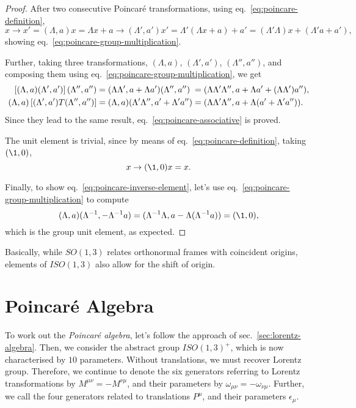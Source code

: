 \begin{proof}
    After two consecutive Poincaré transformations, using eq.~\eqref{eq:poincare-definition},
    \begin{equation*}
        x \to x' = (\Lambda,a)x = \Lambda x + a \to (\Lambda',a')x' = \Lambda' (\Lambda x + a) + a' = (\Lambda' \Lambda)x + (\Lambda' a + a') ,
    \end{equation*}
    showing eq.~\eqref{eq:poincare-group-multiplication}.

    Further, taking three transformations, $(\Lambda,a)$, $(\Lambda',a')$, $(\Lambda'',a'')$, and composing them using eq.~\eqref{eq:poincare-group-multiplication}, we get
    \begin{equation*}
    \begin{alignedat}[t]{2}
        \left[ (\Lambda,a)(\Lambda',a') \right] (\Lambda'',a'') &= (\Lambda\Lambda', a + \Lambda a') (\Lambda'',a'') &&= (\Lambda\Lambda'\Lambda'', a + \Lambda a' + (\Lambda \Lambda')a'') , \\
        (\Lambda,a)\left[(\Lambda',a')T(\Lambda'',a'')\right] &= (\Lambda,a) (\Lambda'\Lambda'', a' + \Lambda' a'') &&= (\Lambda\Lambda'\Lambda'', a+\Lambda(a' + \Lambda' a'')) .
    \end{alignedat}
    \end{equation*}
    Since they lead to the same result, eq.~\eqref{eq:poincare-associative} is proved.

    The unit element is trivial, since by means of eq.~\eqref{eq:poincare-definition}, taking $(\1,0)$,
    \begin{equation*}
        x \to (\1,0) x = x.
    \end{equation*}

    Finally, to show eq.~\eqref{eq:poincare-inverse-element}, let's use eq.~\eqref{eq:poincare-group-multiplication} to compute
    \begin{equation*}
       (\Lambda,a) (\Lambda^{-1}, -\Lambda^{-1}a) = (\Lambda^{-1}\Lambda, a - \Lambda(\Lambda^{-1}a)) = (\1,0),
    \end{equation*}
    which is the group unit element, as expected.
\end{proof}

Basically, while $SO(1,3)$ relates orthonormal frames with coincident origins, elements of $ISO(1,3)$ also allow for the shift of origin.



\section{Poincaré Algebra}
To work out the \emph{Poincaré algebra}, let's follow the approach of sec.~\ref{sec:lorentz-algebra}. Then, we consider the abstract group $ISO(1,3)^+$, which is now characterised by $10$ parameters. Without translations, we must recover Lorentz group. Therefore, we continue to denote the six generators referring to Lorentz transformations by $M^{\mu\nu} = -M^{\nu\mu}$, and their parameters by $\omega_{\mu\nu}=-\omega_{\nu\mu}$. Further, we call the four generators related to translations $P^\mu$, and their parameters $\epsilon_\mu$.

